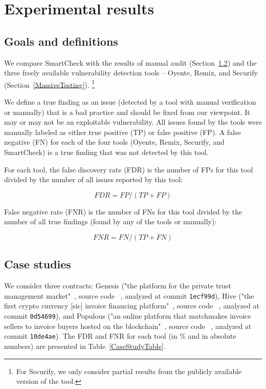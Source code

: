 \section{Experimental results} \label{SectionResults}

\subsection{Goals and definitions}

We compare SmartCheck with the results of manual audit (Section~\ref{ManualAudit}) and the three freely available vulnerability detection tools -- Oyente, Remix, and Securify (Section~\ref{MassiveTesting}).
\footnote{For Securify, we only consider partial results from the publicly available version of the tool.}

We define a true finding as an issue (detected by a tool with manual verification or manually) that is a bad practice and should be fixed from our viewpoint.
It may or may not be an exploitable vulnerability.
All issues found by the tools were manually labeled as either true positive (TP) or false positive (FP).
A false negative (FN) for each of the four tools (Oyente, Remix, Securify, and SmartCheck) is a true finding that was not detected by this tool.

For each tool, the false discovery rate (FDR) is the number of FPs for this tool divided by the number of all issues reported by this tool:

\[FDR = FP / (TP + FP)\]

False negative rate (FNR) is the number of FNs for this tool divided by the number of all true findings (found by any of the tools or manually):

\[FNR = FN / (TP + FN)\]


\subsection{Case studies} \label{ManualAudit}

We consider three contracts: Genesis ("the platform for the private trust management market"~\cite{Genesis}, source code ~\cite{GenesisGithub}, analyzed at commit \texttt{1ecf99d}), Hive ("the first crypto currency [sic] invoice financing platform"~\cite{Hive}, source code ~\cite{HiveGithub}, analyzed at commit \texttt{0d54699}), and Populous ("an online platform that matchmakes invoice sellers to invoice buyers hosted on the blockchain"~\cite{Populous}, source code ~\cite{PopulousGithub}, analyzed at commit \texttt{10de4ae}).
The FDR and FNR for each tool (in \% and in absolute numbers) are presented in Table~\ref{CaseStudyTable}.

